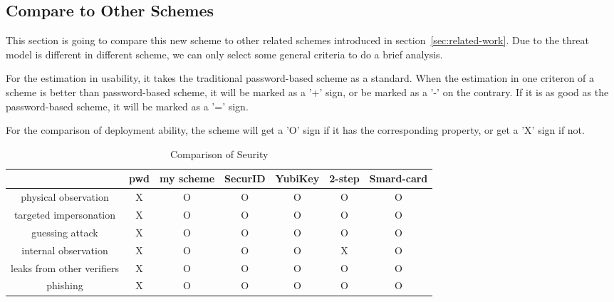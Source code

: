 \begin{CJK}{Bg5}{bsmi}


\chapter{Compare to Other Schemes}

This section is going to compare this new scheme to other related schemes introduced in section~\ref{sec:related-work}. Due to the threat model is different in different scheme, we can only select some general criteria to do a brief analysis. 

For the estimation in usability, it takes the traditional password-based scheme as a standard. When the estimation in one criteron of a scheme is better than password-based scheme, it will be marked as a '+' sign, or be marked as a '-' on the contrary. If it is as good as the password-based scheme, it will be marked as a '=' sign. 

For the comparison of deployment ability, the scheme will get a 'O' sign if it has the corresponding property, or get a 'X' sign if not.

\begin{table}[h]
\begin{tabular}{|c|c|c|c|c|c|c|}
\hline
                           & pwd & my scheme & SecurID & YubiKey & 2-step & Smard-card \\ \hline
physical observation       & X   & O         & O       & O       & O       & O          \\ \hline
targeted impersonation     & X   & O         & O       & O       & O       & O          \\ \hline
guessing attack            & X   & O         & O       & O       & O       & O          \\ \hline
internal observation       & X   & O         & O       & O       & X       & O          \\ \hline
leaks from other verifiers & X   & O         & O       & O       & O       & O          \\ \hline
phishing                   & X   & O         & O       & O       & O       & O          \\ \hline
\end{tabular}
\caption{Comparison of Seurity}
\end{table}


\end{CJK}
